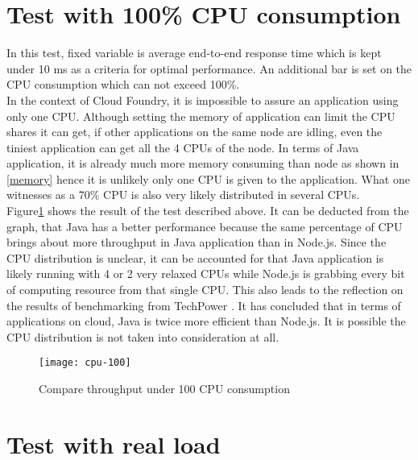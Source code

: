 \section{Test with 100\% CPU consumption}
In this test, fixed variable is average end-to-end response time which is kept under 10 ms  as a criteria for optimal performance. An additional bar is set on the CPU consumption which can not exceed 100\%. \\
In the context of Cloud Foundry, it is impossible to assure an application using only one CPU. Although setting the memory of application can limit the CPU shares it can get, if other applications on the same node are idling, even the tiniest application can get all the 4 CPUs of the node. In terms of Java application, it is already much more memory consuming than node as shown in \ref{memory} hence it is unlikely only one CPU is given to the application. What one witnesses as a 70\% CPU is also very likely distributed in several CPUs.\\
Figure\ref{cpu-100} shows the result of the test described above. It can be deducted from the graph, that Java has a better performance because the same percentage of CPU brings about more throughput in Java application than in Node.js. Since the CPU distribution is unclear, it can be accounted for that Java application is likely running with 4 or 2 very relaxed CPUs while Node.js is grabbing every bit of computing resource from that single CPU. This also leads to the reflection on the results of benchmarking from TechPower \citep{benchmark}. It has concluded that in terms of applications on cloud, Java is twice more efficient than Node.js. It is possible the CPU distribution is not taken into consideration at all. 

\begin{figure}[h]
	\centering
	\texttt{[image: cpu-100]}
	\caption{Compare throughput under 100 CPU consumption}
	\label{cpu-100}
\end{figure}


\section{Test with real load}
